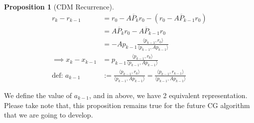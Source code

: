 \documentclass[]{article}
\theoremstyle{definition}
\newtheorem{prop}{Proposition}[section]  %
\begin{document}
            \begin{prop}[CDM Recurrence]\label{prop:CDM_Recurrence}
                \begin{align}
                    r_k - r_{k - 1} &= r_0 - A\overline{P}_kr_0 - (r_0 - A\overline{P}_{k - 1}r_0)
                    \\
                    &= A\overline{P}_kr_0 - A\overline{P}_{k - 1}r_0
                    \\
                    &= - Ap_{k - 1}\frac{\langle p_{k - 1}, r_0\rangle}{\langle p_{k - 1}, Ap_{k - 1}\rangle}
                    \\
                    \implies 
                    x_{k} - x_{k - 1} &= 
                    p_{k - 1}\frac{\langle p_{k - 1}, r_0\rangle}{\langle p_{k - 1}, Ap_{k - 1}\rangle}
                    \\
                    \text{def: } a_{k - 1} &:= \frac{\langle p_{k - 1}, r_0\rangle}{
                        \langle p_{k - 1}, Ap_{k - 1}\rangle
                    } = 
                    \frac{\langle p_{k - 1}, r_{k - 1}\rangle}{
                        \langle p_{k - 1}, Ap_{k - 1}\rangle
                    }
            \end{align}
            \end{prop}
            
            We define the value of $a_{k - 1}$, and in above, we have 2 equivalent representation. Please take note that, this proposition remains true for the future CG algorithm that we are going to develop. 
\end{document}
